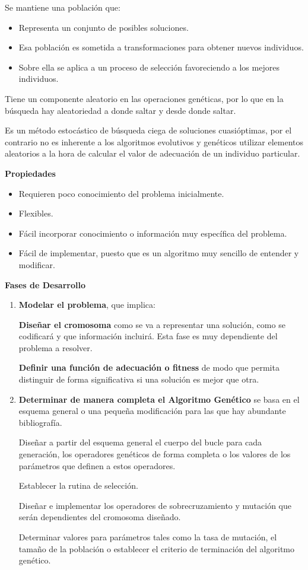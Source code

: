 \documentclass[12pt, twoside, openright]{report} %
\begin{document}
Se mantiene una población que:
\begin{itemize}
	\item Representa un conjunto de posibles soluciones.
	\item Esa población es sometida a transformaciones para obtener nuevos individuos.
	\item Sobre ella se aplica a un proceso de selección favoreciendo a los mejores individuos.
\end{itemize}

Tiene un componente aleatorio en las operaciones genéticas, por lo que en la búsqueda hay aleatoriedad a donde saltar y desde donde saltar.

Es un método estocástico de búsqueda ciega de soluciones cuasióptimas, por el contrario no es inherente a los algoritmos evolutivos y genéticos  utilizar elementos aleatorios a la hora de calcular el valor de adecuación de un individuo particular.

\textbf{Propiedades}
\begin{itemize}
	\item Requieren poco conocimiento del problema inicialmente.
	\item Flexibles.
	\item Fácil incorporar conocimiento o información muy específica del problema.
	\item Fácil de implementar, puesto que es un algoritmo muy sencillo de entender y modificar.
\end{itemize}

\textbf{Fases de Desarrollo}
\begin{enumerate}
	\item \textbf{Modelar el problema}, que implica:

	      \textbf{Diseñar el cromosoma} como se va a representar una solución, como se codificará y que información incluirá. Esta fase es muy dependiente del problema a resolver.

	      \textbf{Definir una función de adecuación o fitness} de modo que permita distinguir de forma significativa si una solución es mejor que otra.
	\item \textbf{Determinar de manera completa el Algoritmo Genético} se basa en el esquema general o una pequeña modificación para las que hay abundante bibliografía.

	      Diseñar a partir del esquema general el cuerpo del bucle para cada generación, los operadores genéticos de forma completa o los valores de los parámetros que definen a estos operadores.

	      Establecer la rutina de selección.

	      Diseñar e implementar los operadores de sobrecruzamiento y mutación que serán dependientes del cromosoma diseñado.

	      Determinar valores para parámetros tales como la tasa de mutación, el tamaño de la población o establecer el criterio de terminación del algoritmo genético.
\end{enumerate}
\end{document}
